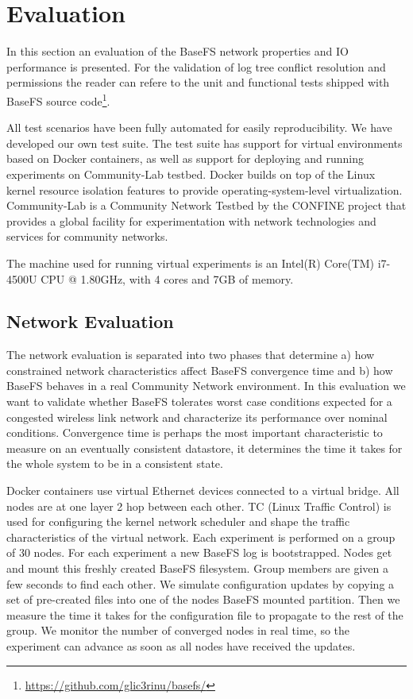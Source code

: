 \documentclass{sig-alternate}
\begin{document}
\section{Evaluation} \label{evaluation}

In this section an evaluation of the BaseFS network properties and IO performance is presented. For the validation of log tree conflict resolution and permissions the reader can refere to the unit and functional tests shipped with BaseFS source code\footnote{\url{https://github.com/glic3rinu/basefs/}}.

All test scenarios have been fully automated for easily reproducibility. We have developed our own test suite. The test suite has support for virtual environments based on Docker containers, as well as support for deploying and running experiments on Community-Lab testbed\cite{selimi2014cloud}. Docker builds on top of the Linux kernel resource isolation features to provide operating-system-level virtualization. Community-Lab is a Community Network Testbed by the CONFINE project that provides a global facility for experimentation with network technologies and services for community networks. 

The machine used for running virtual experiments is an Intel(R) Core(TM) i7-4500U CPU @ 1.80GHz, with 4 cores and 7GB of memory.


\subsection{Network Evaluation}
The network evaluation is separated into two phases that determine a) how constrained network characteristics affect BaseFS convergence time and b) how BaseFS behaves in a real Community Network environment. In this evaluation we want to validate whether BaseFS tolerates worst case conditions expected for a congested wireless link network and characterize its performance over nominal conditions. Convergence time is perhaps the most important characteristic to measure on an eventually consistent datastore, it determines the time it takes for the whole system to be in a consistent state.

Docker containers use virtual Ethernet devices connected to a virtual bridge. All nodes are at one layer 2 hop between each other. TC (Linux Traffic Control) is used for configuring the kernel network scheduler and shape the traffic characteristics of the virtual network. Each experiment is performed on a group of 30 nodes. For each experiment a new BaseFS log is bootstrapped. Nodes get and mount this freshly created BaseFS filesystem. Group members are given a few seconds to find each other. We simulate configuration updates by copying a set of pre-created files into one of the nodes BaseFS mounted partition. Then we measure the time it takes for the configuration file to propagate to the rest of the group. We monitor the number of converged nodes in real time, so the experiment can advance as soon as all nodes have received the updates.
\end{document}
